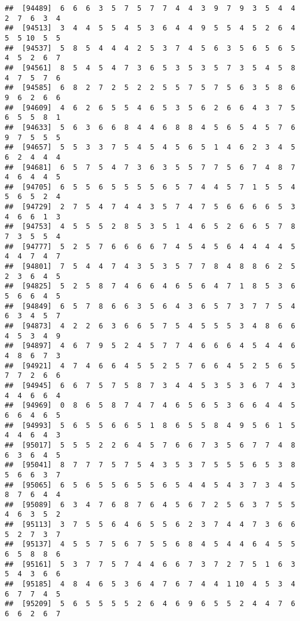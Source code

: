 \documentclass[
]{book}
\begin{document}
\begin{verbatim}
##  [94489]  6  6  6  3  5  7  5  7  7  4  4  3  9  7  9  3  5  4  4  2  7  6  3  4
##  [94513]  3  4  4  5  5  4  5  3  6  4  4  9  5  5  4  5  2  6  4  5  5 10  5  5
##  [94537]  5  8  5  4  4  4  2  5  3  7  4  5  6  3  5  6  5  6  5  4  5  2  6  7
##  [94561]  8  5  4  5  4  7  3  6  5  3  5  3  5  7  3  5  4  5  8  4  7  5  7  6
##  [94585]  6  8  2  7  2  5  2  2  5  5  7  5  7  5  6  3  5  8  6  9  6  2  6  6
##  [94609]  4  6  2  6  5  5  4  6  5  3  5  6  2  6  6  4  3  7  5  6  5  5  8  1
##  [94633]  5  6  3  6  6  8  4  4  6  8  8  4  5  6  5  4  5  7  6  9  7  5  5  5
##  [94657]  5  5  3  3  7  5  4  5  4  5  6  5  1  4  6  2  3  4  5  6  2  4  4  4
##  [94681]  6  5  7  5  4  7  3  6  3  5  5  7  7  5  6  7  4  8  7  4  6  4  4  5
##  [94705]  6  5  5  6  5  5  5  5  6  5  7  4  4  5  7  1  5  5  4  5  6  5  2  4
##  [94729]  2  7  5  4  7  4  4  3  5  7  4  7  5  6  6  6  6  5  3  4  6  6  1  3
##  [94753]  4  5  5  5  2  8  5  3  5  1  4  6  5  2  6  6  5  7  8  7  3  5  5  4
##  [94777]  5  2  5  7  6  6  6  6  7  4  5  4  5  6  4  4  4  4  5  4  4  7  4  7
##  [94801]  7  5  4  4  7  4  3  5  3  5  7  7  8  4  8  8  6  2  5  2  3  6  4  5
##  [94825]  5  2  5  8  7  4  6  6  4  6  5  6  4  7  1  8  5  3  6  5  6  6  4  5
##  [94849]  6  5  7  8  6  6  3  5  6  4  3  6  5  7  3  7  7  5  4  6  3  4  5  7
##  [94873]  4  2  2  6  3  6  6  5  7  5  4  5  5  5  3  4  8  6  6  4  5  3  4  9
##  [94897]  4  6  7  9  5  2  4  5  7  7  4  6  6  6  4  5  4  4  6  4  8  6  7  3
##  [94921]  4  7  4  6  6  4  5  5  2  5  7  6  6  4  5  2  5  6  5  7  7  2  6  6
##  [94945]  6  6  7  5  7  5  8  7  3  4  4  5  3  5  3  6  7  4  3  4  4  6  6  4
##  [94969]  0  8  6  5  8  7  4  7  4  6  5  6  5  3  6  6  4  4  5  6  6  4  6  5
##  [94993]  5  6  5  5  6  6  5  1  8  6  5  5  8  4  9  5  6  1  5  4  4  6  4  3
##  [95017]  5  5  5  2  2  6  4  5  7  6  6  7  3  5  6  7  7  4  8  6  3  6  4  5
##  [95041]  8  7  7  7  5  7  5  4  3  5  3  7  5  5  5  6  5  3  8  5  6  6  3  7
##  [95065]  6  5  6  5  5  6  5  5  6  5  4  4  5  4  3  7  3  4  5  8  7  6  4  4
##  [95089]  6  3  4  7  6  8  7  6  4  5  6  7  2  5  6  3  7  5  5  4  6  3  5  2
##  [95113]  3  7  5  5  6  4  6  5  5  6  2  3  7  4  4  7  3  6  6  5  2  7  3  7
##  [95137]  4  5  5  7  5  6  7  5  5  6  8  4  5  4  4  6  4  5  5  6  5  8  8  6
##  [95161]  5  3  7  7  5  7  4  4  6  6  7  3  7  2  7  5  1  6  3  5  4  3  6  6
##  [95185]  4  8  4  6  5  3  6  4  7  6  7  4  4  1 10  4  5  3  4  6  7  7  4  5
##  [95209]  5  6  5  5  5  5  2  6  4  6  9  6  5  5  2  4  4  7  6  6  6  2  6  7

\end{verbatim}
\end{document}
